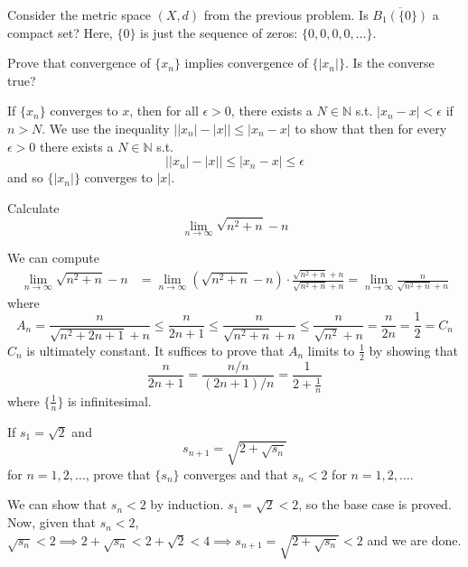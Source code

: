   \begin{exercise}
    Consider the metric space $(X,d)$ from the previous problem. Is $\overline{B_1(\{0\})}$
    a compact set? Here, $\{0\}$ is just the sequence of zeros: $\{0,0,0,0,\ldots\}$.
  \end{exercise}
  
  \begin{exercise}
    Prove that convergence of $\{x_n\}$ implies convergence of $\{|x_n|\}$. Is the converse true? 
  \end{exercise}
  \begin{solution}
    If $\{x_n\}$ converges to $x$, then for all $\epsilon > 0$, there exists a $N \in \mathbb{N}$ s.t. $|x_n - x| < \epsilon$ if $n > N$. We use the inequality $\big| |x_n| - |x| \big| \leq |x_n - x|$ to show that then for every $\epsilon > 0$ there exists a $N \in \mathbb{N}$ s.t. 
    \[ \big| |x_n| - |x| \big| \leq |x_n - x| \leq \epsilon \]
    and so $\{|x_n|\}$ converges to $|x|$. 
  \end{solution}

  \begin{exercise}
    Calculate 
    \[\lim_{n \rightarrow \infty} \sqrt{n^2 + n} - n\]
  \end{exercise}
  \begin{solution}
    We can compute  
    \begin{align*}
        \lim_{n \rightarrow \infty} \sqrt{n^2 + n} - n & = \lim_{n \rightarrow \infty} (\sqrt{n^2 + n} - n) \cdot \frac{\sqrt{n^2 + n} + n}{\sqrt{n^2 + n} + n} = \lim_{n \rightarrow \infty} \frac{n}{\sqrt{n^2 + n} + n}
    \end{align*}
    where 
    \[A_n = \frac{n}{\sqrt{n^2 + 2n + 1} + n} \leq \frac{n}{2n + 1} \leq \frac{n}{\sqrt{n^2 + n} + n} \leq \frac{n}{\sqrt{n^2} + n} = \frac{n}{2n} = \frac{1}{2} = C_n\]
    $C_n$ is ultimately constant. It suffices to prove that $A_n$ limits to $\frac{1}{2}$ by showing that 
    \[\frac{n}{2n + 1} = \frac{n/n}{(2n+1)/n} = \frac{1}{2 + \frac{1}{n}}\]
    where $\{\frac{1}{n}\}$ is infinitesimal. 
  \end{solution}

  \begin{exercise}[Rudin 3.3]
    If $s_1 = \sqrt{2}$ and 
    \[s_{n+1} = \sqrt{2 + \sqrt{s_n}}\]
    for $n = 1, 2, \ldots$, prove that $\{s_n\}$ converges and that $s_n < 2$ for $n = 1, 2, \ldots$. 
  \end{exercise}
  \begin{solution}
    We can show that $s_n < 2$ by induction. $s_1 = \sqrt{2} < 2$, so the base case is proved. Now, given that $s_n < 2$, $\sqrt{s_n} < 2 \implies 2 + \sqrt{s_n} < 2 + \sqrt{2} < 4 \implies s_{n+1} = \sqrt{2 + \sqrt{s_n}} < 2$ and we are done. 
  \end{solution}

